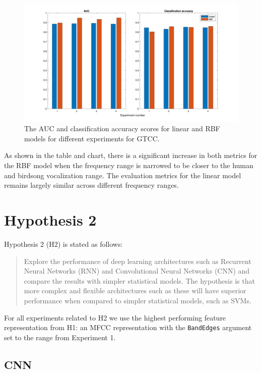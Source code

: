 \begin{figure}[ht]
  \centering
  \includegraphics[width=\textwidth]{figures/hyp1_gtcc.png}
  \caption{The AUC and classification accuracy scores for linear and RBF models
  for different experiments for GTCC.}\label{fig:hyp1_gtcc}
\end{figure}

As shown in the table and chart, there is a significant increase in both metrics
for the RBF model when the frequency range is narrowed to be closer to the human
and birdsong vocalization range. The evaluation metrics for the linear model
remains largely similar across different frequency ranges.

\section{Hypothesis 2}

Hypothesis 2 (H2) is stated as follows:

\begin{quote}
Explore the performance of deep learning architectures such as Recurrent Neural
Networks (RNN) and Convolutional Neural Networks (CNN) and compare the results
with simpler statistical models. The hypothesis is that more complex and
flexible architectures such as these will have superior performance when
compared to simpler statistical models, such as SVMs.
\end{quote}

For all experiments related to H2 we use the highest performing feature
representation from H1: an MFCC representation with the \texttt{BandEdges}
argument set to the range from Experiment 1.

\subsection{CNN}

